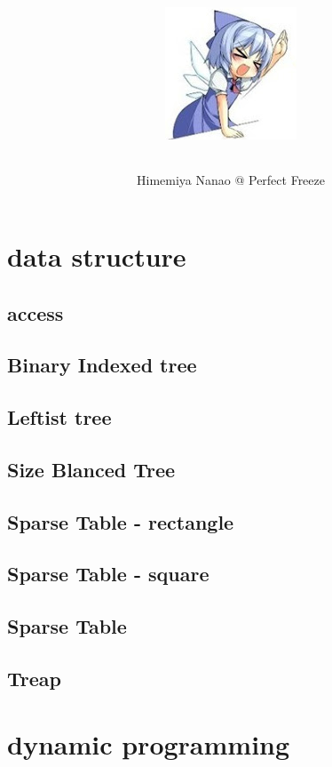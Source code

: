 \documentclass[a4paper,5pt,twocolumn,titlepage]{article}
\title{\TitleFont{Code Library short}
\begin{center}
\includegraphics[scale=2]{./image1.png}
\end{center}
}
\author{Himemiya Nanao @ Perfect Freeze}
\begin{document}
\maketitle \tableofcontents
\newpage
{}

\section{data structure}
\subsection{access}

\subsection{Binary Indexed tree}

\subsection{Leftist tree}

\subsection{Size Blanced Tree}

\subsection{Sparse Table - rectangle}

\subsection{Sparse Table - square}

\subsection{Sparse Table}

\subsection{Treap}

\section{dynamic programming}
\end{document}
